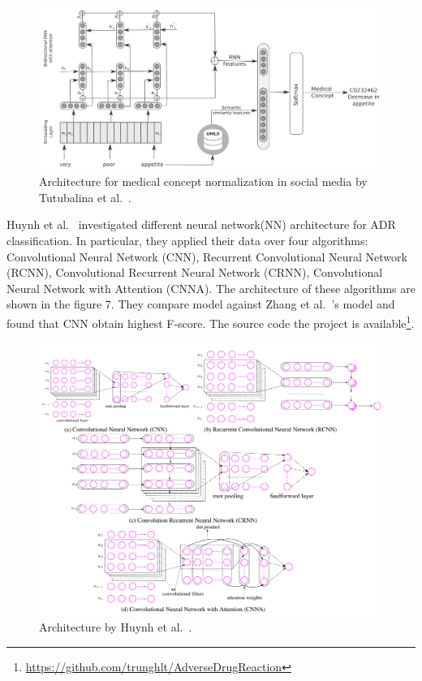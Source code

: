 \begin{figure}[h]
	\centering
	\includegraphics[width=0.99\linewidth]{Figures/f.png}
	\caption{Architecture for medical concept normalization in social media by Tutubalina et al.~\cite{TUTUBALINA201893}.}
	\label{fig:architecture-tutubalina}
\end{figure}

Huynh et al.~\cite{huynh2016adverse} investigated different neural network(NN) architecture for ADR classification. In particular, they applied their data over four algorithms: Convolutional Neural Network (CNN), Recurrent Convolutional Neural Network (RCNN), Convolutional Recurrent Neural Network (CRNN), Convolutional Neural Network with Attention (CNNA). The architecture of these algorithms are shown in the figure 7. They compare model against Zhang et al.~\cite{zhang2016ensemble}’s model and found that CNN obtain highest F-score. The source code the project is available\footnote{\url{https://github.com/trunghlt/AdverseDrugReaction}}.

\begin{figure}[h]
	\centering
	\includegraphics[width=0.99\linewidth]{Figures/e.png}
	\caption{Architecture by Huynh et al.~\cite{huynh2016adverse}.}
	\label{fig:architecture-huynh}
\end{figure}

